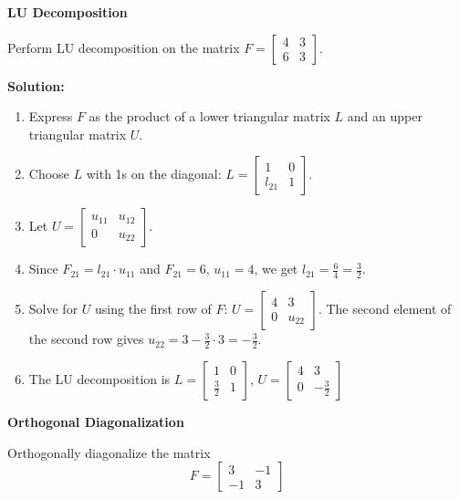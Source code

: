 \documentclass[8pt, a4paper, landscape]{extarticle}
\begin{document}
\begin{multicols*}{4}
  \textbf{LU Decomposition}

  Perform LU decomposition on the matrix $F = \begin{bmatrix} 4 & 3 \\ 6 & 3 \end{bmatrix}$.

  \textbf{Solution:}
  \begin{enumerate}
    \item Express $F$ as the product of a lower triangular matrix $L$ and an upper triangular matrix $U$.
    \item Choose $L$ with 1s on the diagonal: $L = \begin{bmatrix} 1 & 0 \\ l_{21} & 1 \end{bmatrix}$.
    \item Let $U = \begin{bmatrix} u_{11} & u_{12} \\ 0 & u_{22} \end{bmatrix}$.
    \item Since $F_{21} = l_{21} \cdot u_{11}$ and $F_{21} = 6$, $u_{11} = 4$, we get $l_{21} = \frac{6}{4} = \frac{3}{2}$.
    \item Solve for $U$ using the first row of $F$: $U = \begin{bmatrix} 4 & 3 \\ 0 & u_{22} \end{bmatrix}$. The second element of the second row gives $u_{22} = 3 - \frac{3}{2} \cdot 3 = -\frac{3}{2}$.
    \item The LU decomposition is $L = \begin{bmatrix} 1 & 0 \\ \frac{3}{2} & 1 \end{bmatrix}$, $U = \begin{bmatrix} 4 & 3 \\ 0 & -\frac{3}{2} \end{bmatrix}$
  \end{enumerate}

  \textbf{Orthogonal Diagonalization}

  Orthogonally diagonalize the matrix
  \[
    F = \begin{bmatrix} 3 & -1 \\ -1 & 3 \end{bmatrix}
  \]


\end{multicols*}
\end{document}
